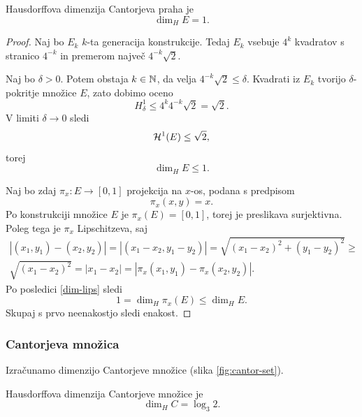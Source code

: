 \begin{trditev}
    Hausdorffova dimenzija Cantorjeva praha je
    \[\dim_H E = 1.\]
\end{trditev}

\begin{proof}
    Naj bo \(E_k\) \(k\)-ta generacija konstrukcije. Tedaj \(E_k\) vsebuje \(4^k\) kvadratov s stranico \(4^{-k}\) in premerom največ \(4^{-k} \sqrt{2}\).

    Naj bo \(\delta > 0\). Potem obstaja \(k \in \mathbb{N}\), da velja \(4^{-k} \sqrt{2} \leq \delta\). Kvadrati iz \(E_k\) tvorijo \(\delta\)-pokritje množice \(E\), zato dobimo oceno
    \[H^1_\delta \leq 4^k 4^{-k}\sqrt{2} = \sqrt{2}.\]
    V limiti \(\delta \to 0\) sledi
    \[\mathcal{H}^1(E) \leq \sqrt{2},\]
    torej 
    \[\dim_H E \leq 1.\]

    Naj bo zdaj \(\pi_x: E \to [0,1]\) projekcija na \(x\)-os, podana s predpisom
    \[
        \pi_x(x, y) = x.
    \]
    Po konstrukciji množice \(E\) je \(\pi_x(E) = [0,1]\), torej je preslikava surjektivna. Poleg tega je \(\pi_x\) Lipschitzeva, saj
    \begin{multline*}
        |(x_1, y_1) - (x_2, y_2)| = |(x_1 - x_2, y_1 - y_2)| = \sqrt{(x_1 - x_2)^2 + (y_1 - y_2)^2} \geq \\ \sqrt{(x_1 - x_2)^2} = |x_1 - x_2| = |\pi_x(x_1, y_1) - \pi_x(x_2, y_2)|.
    \end{multline*}
    Po posledici \ref{dim-lips} sledi
    \[1 = \dim_H \pi_x (E) \leq \dim_H E.\]
    Skupaj s prvo neenakostjo sledi enakost.
\end{proof}

\subsubsection{Cantorjeva množica}
Izračunamo dimenzijo Cantorjeve množice (slika \ref{fig:cantor-set}).

\begin{trditev}
    Hausdorffova dimenzija Cantorjeve množice je
    \[\dim_H C = \log_3 2.\]
\end{trditev}

